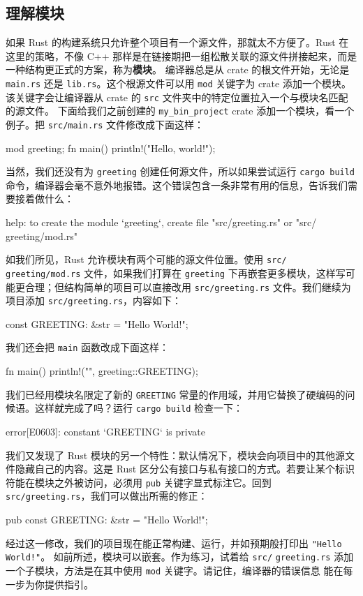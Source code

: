 \subsection{理解模块}
\label{idx:idx_e871ef3a}
\label{idx:idx_d4f300ce}
如果 Rust 的构建系统只允许整个项目有一个源文件，那就太不方便了。Rust 在这里的策略，不像 C++ 那样是在链接期把一组松散关联的源文件拼接起来，而是一种结构更正式的方案，称为\textbf{模块}。
编译器总是从 crate 的根文件开始，无论是 \texttt{main.rs} 还是 \texttt{lib.rs}。这个根源文件可以用 \texttt{mod} 关键字为 crate 添加一个模块。该关键字会让编译器从 crate 的 \texttt{src} 文件夹中的特定位置拉入一个与模块名匹配的源文件。
下面给我们之前创建的 \texttt{my\_\allowbreak{}bin\_\allowbreak{}project} crate 添加一个模块，看一个例子。把 \texttt{src/main.rs} 文件修改成下面这样：
\begin{codebox}[rust]
mod greeting;
fn main() {
    println!("Hello, world!");
}
\end{codebox}
当然，我们还没有为 \texttt{greeting} 创建任何源文件，所以如果尝试运行 \texttt{cargo build} 命令，编译器会毫不意外地报错。这个错误包含一条非常有用的信息，告诉我们需要接着做什么：
\begin{codebox}[rust]
help: to create the module `greeting`, create file "src/greeting.rs" or "src/
greeting/mod.rs"
\end{codebox}
如我们所见，Rust 允许模块有两个可能的源文件位置。使用 \texttt{src/}
\texttt{greeting/\allowbreak{}mod.\allowbreak{}rs} 文件，如果我们打算在
\texttt{greeting} 下再嵌套更多模块，这样写可能更合理；但结构简单的项目可以直接改用 \texttt{src/\allowbreak{}greeting.\allowbreak{}rs} 文件。我们继续为项目添加 \texttt{src/\allowbreak{}greeting.\allowbreak{}rs}，内容如下：
\begin{codebox}[rust]
const GREETING: &str = "Hello World!";
\end{codebox}
我们还会把 \texttt{main} 函数改成下面这样：
\begin{codebox}[rust]
fn main() {
    println!("{}", greeting::GREETING);
}
\end{codebox}
\label{idx:idx_9426c06a}
\label{idx:idx_560f9930}
我们已经用模块名限定了新的 \texttt{GREETING} 常量的作用域，并用它替换了硬编码的问候语。这样就完成了吗？运行 \texttt{cargo build} 检查一下：
\begin{codeboxdark}
error[E0603]: constant `GREETING` is private
\end{codeboxdark}
我们又发现了 Rust 模块的另一个特性：默认情况下，模块会向项目中的其他源文件隐藏自己的内容。这是 Rust 区分公有接口与私有接口的方式。若要让某个标识符能在模块之外被访问，必须用 \texttt{pub} 关键字显式标注它。回到 \texttt{src/\allowbreak{}greeting.\allowbreak{}rs}，我们可以做出所需的修正：
\begin{codebox}[rust]
pub const GREETING: &str = "Hello World!";
\end{codebox}
经过这一修改，我们的项目现在能正常构建、运行，并如预期般打印出 \texttt{"Hello World!"}。
如前所述，模块可以嵌套。作为练习，试着给 \texttt{src/}
\texttt{greeting.rs} 添加一个子模块，方法是在其中使用 \texttt{mod} 关键字。请记住，编译器的错误信息
能在每一步为你提供指引。
